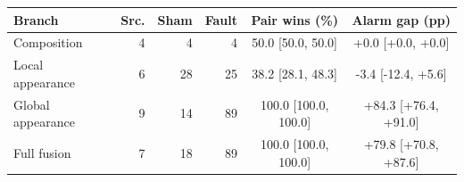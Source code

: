 \begin{tabular}{lrrrcc}
\toprule
Branch & Src. & Sham & Fault & Pair wins (\%) & Alarm gap (pp) \\
\midrule
Composition & 4 & 4 & 4 & 50.0 [50.0, 50.0] & +0.0 [+0.0, +0.0] \\
Local appearance & 6 & 28 & 25 & 38.2 [28.1, 48.3] & -3.4 [-12.4, +5.6] \\
Global appearance & 9 & 14 & 89 & 100.0 [100.0, 100.0] & +84.3 [+76.4, +91.0] \\
Full fusion & 7 & 18 & 89 & 100.0 [100.0, 100.0] & +79.8 [+70.8, +87.6] \\
\bottomrule
\end{tabular}
